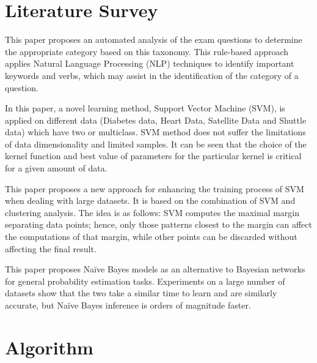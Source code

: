 \documentclass[12pt,oneside,a4paper]{article}
\begin{document}
	\section{Literature Survey}

		\begin{description}[style=nextline]
			\item[\cite{ref:omar:2012} \bibentry{ref:omar:2012}]
			This paper proposes an automated analysis of the exam questions to determine the appropriate category based on this taxonomy. This rule-based approach applies Natural Language Processing (NLP) techniques to identify important keywords and verbs, which may assist in the identification of the category of a question. \\ 
			\newpage

			\item[\cite{ref:lekha} \bibentry{ref:lekha}]
			In this paper, a novel learning method, Support Vector Machine (SVM), is applied on different data (Diabetes data, Heart Data, Satellite Data and Shuttle data) which have two or multiclass. SVM method does not suffer the limitations of data dimensionality and limited samples. It can be seen that the choice of the kernel function and best value of parameters for the particular kernel is critical for a given amount of data. \\

			\item[\cite{ref:awad:2004} \bibentry{ref:awad:2004}]
			This paper proposes a new approach for enhancing the training process of SVM when dealing with large datasets. It is based on the combination of SVM and clustering analysis. The idea is as follows: SVM computes the maximal margin separating data points; hence, only those patterns closest to the margin can affect the computations of that margin, while other points can be discarded without affecting the final result. \\

			\item[\cite{ref:lowd:2005} \bibentry{ref:lowd:2005}]
			This paper proposes Na\"ive Bayes models as an alternative to Bayesian networks for general probability estimation tasks. Experiments on a large number of datasets show that the two take a similar time to learn and are similarly accurate, but Na\"ive Bayes inference is orders of magnitude faster. \\
		\end{description}
		
		\section{Algorithm}
		
\end{document}
